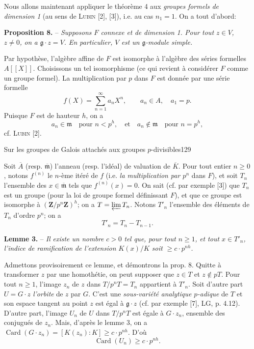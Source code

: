 Nous allons maintenant appliquer le théorème 4 aux \textit{groupes formels de dimension 1} (au sens de \textsc{Lubin} [2], [3]), i.e. au cas $n_1=1$. On a tout d'abord:

\textbf{Proposition 8.} -- \textit{Supposons $F$ connexe et de dimension 1. Pour tout $z\in V$, $z\ne0$, on a $\mathfrak g\cdot z=V$. En particulier, $V$ est un $\mathfrak g$-module simple.}

Par hypothèse, l'algèbre affine de $F$ est isomorphe à l'algèbre des séries formelles $A[[X]]$. Choisissons un tel isomorphisme (ce qui revient à considérer $F$ comme un groupe formel). La multiplication par $p$ dans $F$ est donnée par une série formelle
\[
f(X)=\sum_{n=1}^{\infty}a_nX^n,\qquad a_n\in A,\quad a_1=p.
\]
Puisque $F$ est de hauteur $h$, on a
\[
a_n\in\mathfrak m\quad\text{pour }n<p^h,\quad\text{et}\quad a_n\notin\mathfrak m\quad\text{pour }n=p^h,
\]
cf. \textsc{Lubin} [2].

Sur les groupes de Galois attachés aux groupes $p$-divisibles\hfill 129

Soit $\overline A$ (resp. $\overline{\mathfrak m}$) l'anneau (resp. l'idéal) de valuation de $\overline K$. Pour tout entier $n\geq0$, notons $f^{(n)}$ le $n$-ème itéré de $f$ (i.e. \textit{la multiplication par $p^n$} dans $F$), et soit $T_n$ l'ensemble des $x\in\overline{\mathfrak m}$ tels que $f^{(n)}(x)=0$. On sait (cf. par exemple [3]) que $T_n$ est un groupe (pour la loi de groupe formel définissant $F$), et que ce groupe est isomorphe à $(\mathbf Z/p^n\mathbf Z)^h$; on a $T=\varprojlim T_n$. Notons $T'_n$ l'ensemble des éléments de $T_n$ d'ordre $p^n$; on a
\[
T'_n=T_n-T_{n-1}.
\]

\textbf{Lemme 3.} -- \textit{Il existe un nombre $c>0$ tel que, pour tout $n\geq1$, et tout $x\in T'_n$, l'indice de ramification de l'extension $K(x)/K$ soit $\geq c\cdot p^{nh}$.}

Admettons provisoirement ce lemme, et démontrons la prop. 8. Quitte à transformer $z$ par une homothétie, on peut supposer que $z\in T$ et $z\notin pT$. Pour tout $n\geq1$, l'image $z_n$ de $z$ dans $T/p^nT=T_n$ appartient à $T'_n$. Soit d'autre part $U=G\cdot z$ \textit{l'orbite} de $z$ par $G$. C'est une \textit{sous-variété analytique $p$-adique} de $T$ et son espace tangent au point $z$ est égal à $\mathfrak g\cdot z$ (cf. par exemple [7], LG, p. 4.12). D'autre part, l'image $U_n$ de $U$ dans $T/p^nT$ est égale à $G\cdot z_n$, ensemble des conjugués de $z_n$. Mais, d'après le lemme 3, on a $\operatorname{Card}(G\cdot z_n)=[K(z_n):K]\geq c\cdot p^{nh}$. D'où
\[
\operatorname{Card}(U_n)\geq c\cdot p^{nh}.
\]

